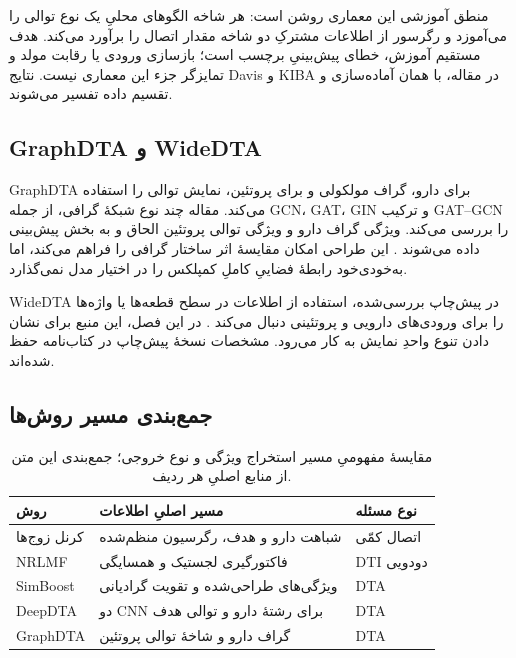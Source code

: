 منطق آموزشی این معماری روشن است: هر شاخه الگوهای محلیِ یک نوع توالی را می‌آموزد و رگرسور از اطلاعات مشترکِ دو شاخه مقدار اتصال را برآورد می‌کند. هدف مستقیم آموزش، خطای پیش‌بینیِ برچسب است؛ بازسازی ورودی یا رقابت مولد و تمایزگر جزء این معماری نیست. نتایج Davis و KIBA در مقاله، با همان آماده‌سازی و تقسیم داده تفسیر می‌شوند.

\subsection{GraphDTA و WideDTA}
GraphDTA برای دارو، گراف مولکولی و برای پروتئین، نمایش توالی را استفاده می‌کند. مقاله چند نوع شبکهٔ گرافی، از جمله GCN، GAT، GIN و ترکیب GAT--GCN را بررسی می‌کند. ویژگی گراف دارو و ویژگی توالی پروتئین الحاق و به بخش پیش‌بینی داده می‌شوند \cite{Nguyen21GraphDTA}. این طراحی امکان مقایسهٔ اثر ساختار گرافی را فراهم می‌کند، اما به‌خودی‌خود رابطهٔ فضاییِ کاملِ کمپلکس را در اختیار مدل نمی‌گذارد.

WideDTA در پیش‌چاپ بررسی‌شده، استفاده از اطلاعات در سطح قطعه‌ها یا واژه‌ها را برای ورودی‌های دارویی و پروتئینی دنبال می‌کند \cite{Ozturk19WideDTA}. در این فصل، این منبع برای نشان دادن تنوع واحدِ نمایش به کار می‌رود. مشخصات نسخهٔ پیش‌چاپ در کتاب‌نامه حفظ شده‌اند.

\subsection{جمع‌بندی مسیر روش‌ها}
\begin{table}[!htbp]
\centering
\caption{مقایسهٔ مفهومیِ مسیر استخراج ویژگی و نوع خروجی؛ جمع‌بندی این متن از منابع اصلیِ هر ردیف.}
\label{tab:prior-methods}
\small
\begin{tabular}{|p{2cm}|p{6.3cm}|p{4cm}|}
\hline
روش & مسیر اصلیِ اطلاعات & نوع مسئله \\ \hline
کرنل زوج‌ها \cite{Pahikkala15RealisticDTA} & شباهت دارو و هدف، رگرسیون منظم‌شده & اتصال کمّی \\ \hline
NRLMF \cite{Liu16NRLMF} & فاکتورگیری لجستیک و همسایگی & DTI دودویی \\ \hline
SimBoost \cite{He17SimBoost} & ویژگی‌های طراحی‌شده و تقویت گرادیانی & DTA \\ \hline
DeepDTA \cite{Ozturk18DeepDTA} & دو CNN برای رشتهٔ دارو و توالی هدف & DTA \\ \hline
GraphDTA \cite{Nguyen21GraphDTA} & گراف دارو و شاخهٔ توالی پروتئین & DTA \\ \hline
\end{tabular}
\end{table}


